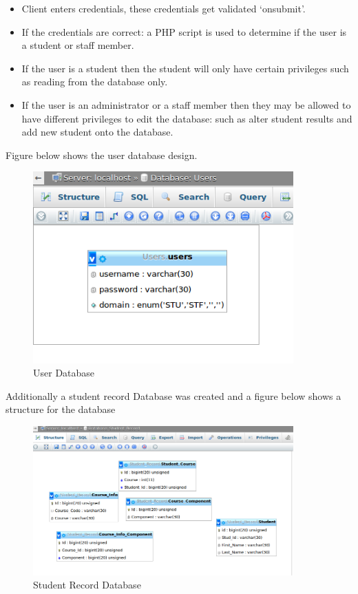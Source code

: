 \documentclass[10pt,onecolumn]{RequimentsGathering}
\begin{document}
\begin{itemize}
\item Client enters credentials, these credentials get validated ‘onsubmit’.
\item If the credentials are correct: a PHP script is used to determine if the user is a  student or staff member.
\item If the user is a student then the student will only have certain privileges such as reading from the database only.
\item If the user is an administrator or a staff member then they may be allowed to have different privileges to edit the database: such as alter student results and add new student onto the database.
\end{itemize}


Figure below shows the user database design.

\newpage

\begin{center}
\begin{figure}[h]
\centering
\includegraphics[width=10cm]{Users}
\caption{User Database}
\end{figure}
\end{center}
     
Additionally a student record Database was created and a figure below shows a structure for the database

\begin{center}
\begin{figure}[h]
\centering
\includegraphics[width=10cm]{StudentRecord}
\caption{Student Record Database}
\end{figure}
\end{center}

\newpage
	
	\vfill
	
	
	
	
	
\end{document}
